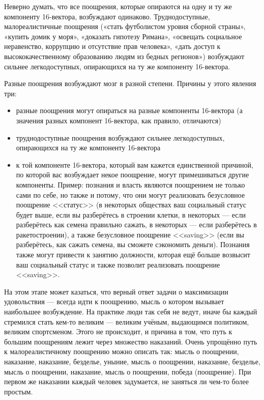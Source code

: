 \documentclass[11pt]{article}
\theoremstyle{remark}
\theoremstyle{definition}
\begin{document}
Неверно думать, что все поощрения, которые опираются на одну и ту же компоненту 16-вектора, возбуждают одинаково. Труднодоступные, малореалистичные поощрения («стать футболистом уровня сборной страны», «купить домик у моря», «доказать гипотезу Римана», «освещать социальное неравенство, коррупцию и отсутствие прав человека», «дать доступ к высококачественному образованию людям из бедных регионов») возбуждают сильнее легкодоступных, опирающихся на ту же компоненту 16-вектора.



Разные поощрения возбуждают мозг в разной степени. Причины у этого явления три:

\begin{itemize}

\item разные поощрения могут опираться на разные компоненты 16-вектора (а значения разных компонент 16-вектора, как правило, отличаются)

\item труднодоступные поощрения возбуждают сильнее легкодоступных, опирающихся на ту же компоненту 16-вектора 

\item к той компоненте 16-вектора, который вам кажется единственной причиной, по которой вас возбуждает некое поощрение, могут примешиваться другие компоненты. Пример: познания и власть являются поощрением не только сами по себе, но также и потому, что они могут реализовать безусловное поощрение <<статус>> (в некоторых обществах ваш социальный статус будет выше, если вы разберётесь в строении клетки, в некоторых --- если разберётесь как семена правильно сажать, в некоторых --- если разберётесь в ракетостроении), а также безусловное поощрение <<saving>> (если вы разберётесь, как сажать семена, вы сможете сэкономить деньги). Познания также могут привести к занятию должности, которая ещё больше возвысит ваш социальный статус и также позволит реализовать поощрение <<saving>>.
\end{itemize}

На этом этапе может казаться, что верный ответ задачи о максимизации удовольствия --- всегда идти к поощрению, мысль о котором вызывает наибольшее возбуждение. На практике люди так себя не ведут, иначе бы каждый стремился стать кем-то великим --- великим учёным, выдающимся политиком, великим спортсменом. Этого не происходит, и причина в том, что путь к большим поощрениям лежит через множество наказаний. Очень упрощённо путь к малореалистичному поощрению можно описать так: мысль о поощрении, наказание, наказание, безделье, уныние, мысль о поощрении, наказание, безделье, мысль о поощрении, наказание, мысль о поощрении, победа (поощрение). При первом же наказании каждый человек задумается, не заняться ли чем-то более простым.
\end{document}
